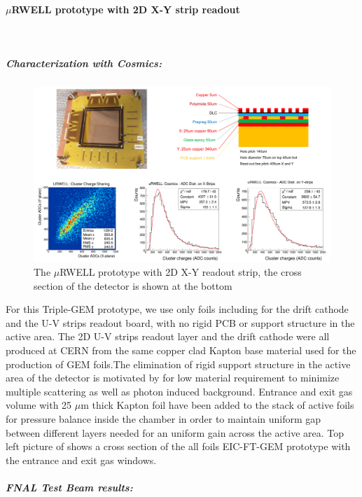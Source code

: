 \paragraph*{$\mu$RWELL  prototype with 2D X-Y strip readout}\mbox{}\\
\subparagraph*{\textbf Characterization with Cosmics:}
%
\begin{figure}[htb]
\centering
\includegraphics[width=1\columnwidth,trim={0pt 0mm 0pt 0mm},clip]{UVa_plots/uRwellCosmics}
\caption{\label{fig:uRwellCosmics} The $\mu$RWELL prototype with 2D X-Y readout strip, the cross section of the detector is shown at the bottom}
\end{figure}
%
For this Triple-GEM prototype, we use only foils including for the drift cathode and the U-V strips readout board, with no rigid PCB or support structure  in the active area. The 2D U-V strips readout layer and the drift cathode were all produced at CERN from the same copper clad Kapton base material used for the production of GEM foils.The elimination of rigid support structure in the active area of the detector is motivated by for low material requirement to minimize multiple scattering as well as photon induced background. Entrance and exit gas volume with 25 $\mu$m thick Kapton foil have been added to the stack of active foils for pressure balance inside the chamber in order to maintain uniform gap between different layers needed for an uniform gain across the active area.  Top left picture of shows a cross section of the all foils EIC-FT-GEM prototype with the entrance and exit gas windows.
%
\subparagraph*{\textbf FNAL Test Beam results:}
%
